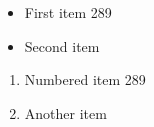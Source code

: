 \documentclass{article}
\begin{document}
\begin{itemize}
\item First item 289
\item Second item
\end{itemize}
\begin{enumerate}
\item Numbered item 289
\item Another item
\end{enumerate}
\end{document}
